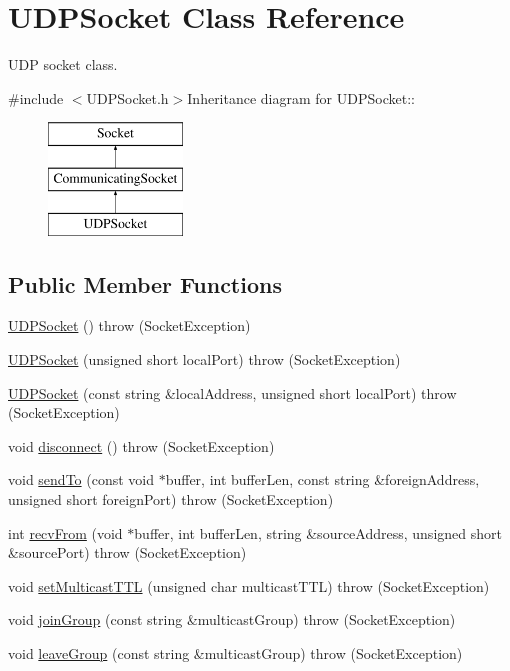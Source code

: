 \hypertarget{classUDPSocket}{
\section{UDPSocket Class Reference}
\label{classUDPSocket}
}


UDP socket class.  


{\ttfamily \#include $<$UDPSocket.h$>$}Inheritance diagram for UDPSocket::\begin{figure}[H]
\begin{center}
\leavevmode
\includegraphics[height=3cm]{classUDPSocket}
\end{center}
\end{figure}
\subsection*{Public Member Functions}
\begin{DoxyCompactItemize}
\item 
\hyperlink{classUDPSocket_a4f86f3023f5a08f6355802599a10e100}{UDPSocket} ()  throw (SocketException)
\item 
\hyperlink{classUDPSocket_a14dcb55c4b60b12d4a7fff648cbb825f}{UDPSocket} (unsigned short localPort)  throw (SocketException)
\item 
\hyperlink{classUDPSocket_af19281c523f15ed30d7d78f09033713d}{UDPSocket} (const string \&localAddress, unsigned short localPort)  throw (SocketException)
\item 
void \hyperlink{classUDPSocket_a7482e8e61cef160e1a7c0d6ac15c01be}{disconnect} ()  throw (SocketException)
\item 
void \hyperlink{classUDPSocket_a41a3595e226f273953cbd38618af5d5b}{sendTo} (const void $\ast$buffer, int bufferLen, const string \&foreignAddress, unsigned short foreignPort)  throw (SocketException)
\item 
int \hyperlink{classUDPSocket_abcd5c064e2496bd8b1888fd4e1b68949}{recvFrom} (void $\ast$buffer, int bufferLen, string \&sourceAddress, unsigned short \&sourcePort)  throw (SocketException)
\item 
void \hyperlink{classUDPSocket_a4dcfff33b45d1b84b5a602fc6f4a27f8}{setMulticastTTL} (unsigned char multicastTTL)  throw (SocketException)
\item 
void \hyperlink{classUDPSocket_a1b20c1e8bd49a9bd9b53dd4f1c8d4c11}{joinGroup} (const string \&multicastGroup)  throw (SocketException)
\item 
void \hyperlink{classUDPSocket_a78835eaeca8a5ac039b4579c795e3640}{leaveGroup} (const string \&multicastGroup)  throw (SocketException)
\end{DoxyCompactItemize}


